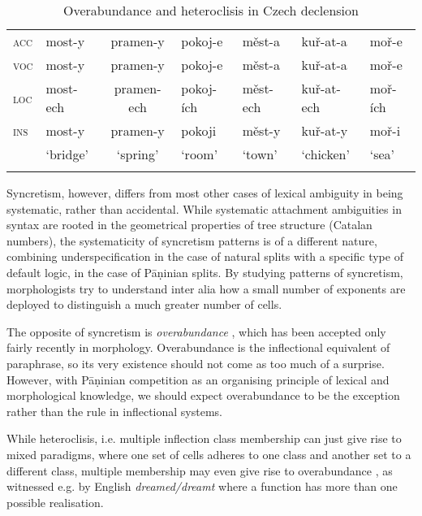 \documentclass[output=paper]{langscibook}
\begin{document}
\begin{table}
{\begin{tabular}{lll@{\hspace{.75\tabcolsep}}lllll}
\scshape acc & most-y & \multicolumn{2}{c}{pramen-y} & pokoj-e & měst-a & kuř-at-a & moř-e\\
\scshape voc & most-y & \multicolumn{2}{c}{pramen-y} & pokoj-e & měst-a & kuř-at-a & moř-e\\
\scshape loc & most-ech & \multicolumn{2}{c}{pramen-ech} & pokoj-ích & měst-ech & kuř-at-ech & moř-ích\\
\scshape ins & most-y & \multicolumn{2}{c}{pramen-y} & pokoji & měst-y & kuř-at-y & moř-i\\
\midrule
& ‘bridge’ & \multicolumn{2}{c}{‘spring’} & ‘room’ & ‘town’ & ‘chicken’ & ‘sea’\\
\lspbottomrule
\end{tabular}}
\caption{Overabundance and heteroclisis in Czech declension \citep{Bonami17b}\label{tab:cz:ov}}
\end{table}

Syncretism, however, differs from most other cases of lexical
ambiguity in being systematic, rather than accidental. While
systematic attachment ambiguities in syntax are rooted in the
geometrical properties of tree structure (Catalan numbers), the
systematicity of syncretism patterns is of a different nature,
combining underspecification in the case of natural splits with a
specific type of default logic, in the case of Pāṇinian splits. By
studying patterns of syncretism, morphologists try to understand inter
alia how a small number of exponents are deployed to distinguish a
much greater number of cells.\largerpage

\begin{sloppypar}
  The opposite of syncretism is \emph{overabundance}
  \citep{Thornton2011,Thornton12,Thornton19}, which has been accepted
  only fairly recently in morphology. Overabundance is the
  inflectional equivalent of paraphrase, so its very existence should
  not come as too much of a surprise. However, with Pāṇinian
  competition as an organising principle of lexical and morphological
  knowledge, we should expect overabundance to be the exception rather
  than the rule in inflectional systems.
\end{sloppypar}

While heteroclisis, i.e. multiple inflection class membership can just
give rise to mixed paradigms, where one set of cells adheres to one
class and another set to a different class, multiple membership may
even give rise to overabundance \citep{Thornton2011}, as witnessed
e.g. by English \textit{dreamed/dreamt} where a function has more than
one possible realisation. 
\end{document}

